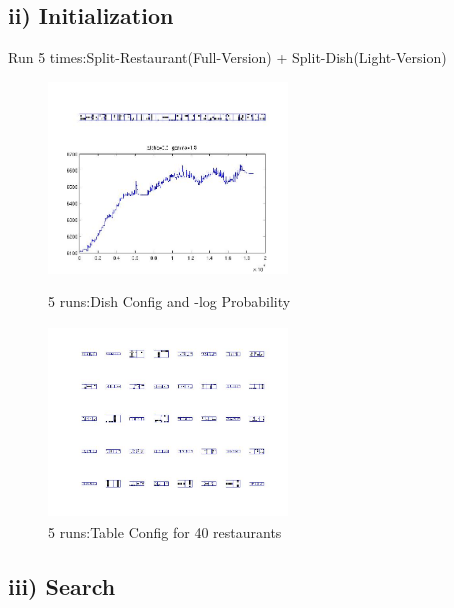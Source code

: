 \documentclass{article}
\begin{document}
\begin{spacing}{1.1}
\subsection{ii) Initialization}
Run 5 times:Split-Restaurant(Full-Version) + Split-Dish(Light-Version)
\begin{figure}[h] 
  \begin{minipage}[b]{0.5\textwidth} 
    \centering 
    \includegraphics[width=2.5in,height=2in]{init1_5.jpg} 
    \caption{5 runs:Dish Config and -log Probability}
    \label{fig:by:table} 
  \end{minipage}%
  \begin{minipage}[b]{0.5\textwidth} 
    \centering 
    \includegraphics[width=2.5in,height=2in]{init1_5d.jpg} 
    \caption{5 runs:Table Config for 40 restaurants}
    \label{fig:by:table}  
   \end{minipage}%
\end{figure}

\subsection{iii) Search}


\end{spacing}
\end{document}
